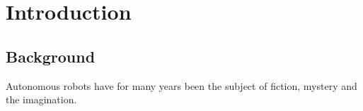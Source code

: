 %
%
%
%
%
%


\chapter{Introduction}
\label{cha:introduction}

\section{Background}
\label{sec:intro_background}
Autonomous robots have for many years been the subject of fiction, mystery and the imagination. 

